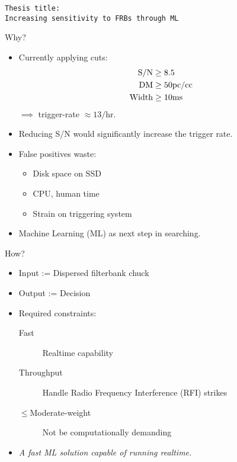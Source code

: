 

\begin{frame}
\begin{center}
\vspace*{\vfill}
\texttt{\large Thesis title:}\\
\texttt{\Huge Increasing sensitivity to FRBs through ML}
\vspace*{\vfill}
\end{center}
\end{frame}

\begin{frame}{Why?}
\begin{itemize}
		\item Currently applying cuts: 
		\begin{align}
			{\rm S/N} &\geq 8.5 \\
			{\rm DM}  &\geq 50 {\rm pc/cc} \\
			{\rm Width} &\geq 10 {\rm ms}
		\end{align} $\implies$ trigger-rate $\approx 13/$hr.
		\item Reducing S/N would significantly increase the trigger rate.
		\item False positives waste: \begin{itemize}
			\item Disk space on SSD
			\item CPU, human time
			\item Strain on triggering system
		\end{itemize}
	\item Machine Learning (ML) as next step in searching.
\end{itemize}
\end{frame}

\begin{frame}{How?}
\begin{itemize}
	\item Input  := Dispersed filterbank chuck
	\item Output := Decision
	\item Required constraints: 
		\begin{description}
		\item[Fast] Realtime capability
		\item[Throughput] Handle Radio Frequency Interference (RFI) strikes
		\item[$\leq$Moderate-weight] Not be computationally demanding
		\end{description}
	\item \emph{A fast ML solution capable of running realtime.}
\end{itemize}
\end{frame}

